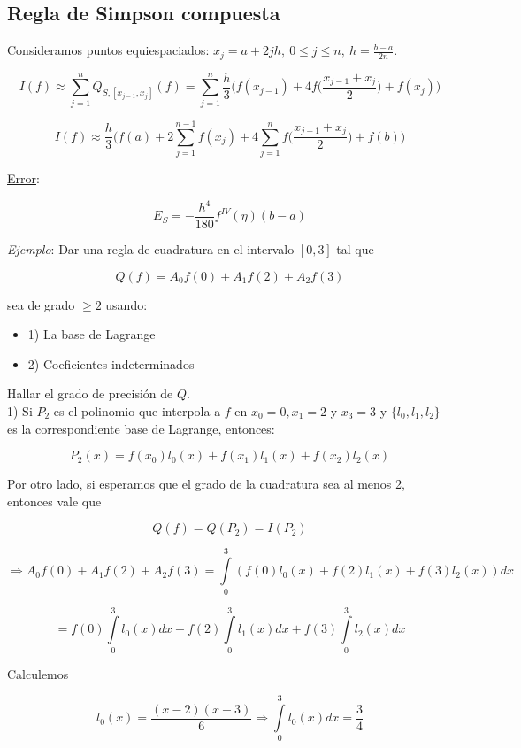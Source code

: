 \subsection{Regla de Simpson compuesta}

Consideramos puntos equiespaciados: $x_{j} = a + 2jh,\ 0 \leq j \leq n,\ h = \frac{b - a}{2n}$.

$$I(f) \approx \sum \limits_{j = 1}^{n} Q_{S, [x_{j - 1}, x_{j}]}(f) = \sum \limits_{j = 1}^{n} \frac{h}{3} \bigg(f(x_{j - 1}) + 4f\bigg( \frac{x_{j - 1} + x_{j}}{2}\bigg) + f(x_{j}) \bigg)$$

$$I(f) \approx \frac{h}{3} \bigg(f(a) + 2\sum \limits_{j = 1}^{n - 1}    f(x_{j}) + 4\sum \limits_{j = 1}^{n}f\bigg( \frac{x_{j - 1} + x_{j}}{2}\bigg) + f(b) \bigg)$$

\underline{Error}:

$$E_{S} = - \frac{h^{4}}{180} f^{IV}(\eta)(b - a)$$

\textit{Ejemplo}: Dar una regla de cuadratura en el intervalo $[0, 3]$ tal que 

$$Q(f) = A_{0}f(0) + A_{1}f(2) + A_{2}f(3)$$

sea de grado $\geq 2$ usando:

\begin{itemize}
	\item 1) La base de Lagrange
	\item 2) Coeficientes indeterminados
\end{itemize}

Hallar el grado de precisi\'on de $Q$.\\

1) Si $P_{2}$ es el polinomio que interpola a $f$ en $x_{0} = 0, x_{1} = 2$ y $x_{3} = 3$ y $\{l_{0}, l_{1}, l_{2}\}$ es la correspondiente base de Lagrange, entonces:

$$P_{2}(x) = f(x_{0})l_{0}(x) + f(x_{1})l_{1}(x) + f(x_{2})l_{2}(x)$$

Por otro lado, si esperamos que el grado de la cuadratura sea al menos 2, entonces vale que

$$Q(f) = Q(P_{2}) = I(P_{2})$$

$$\Rightarrow A_{0}f(0) + A_{1}f(2) + A_{2}f(3) = \int \limits_{0}^{3} (f(0)l_{0}(x) + f(2)l_{1}(x) + f(3)l_{2}(x))dx$$

$$ = f(0)\int \limits_{0}^{3} l_{0}(x) dx + f(2)\int \limits_{0}^{3}l_{1}(x) dx + f(3)\int \limits_{0}^{3} l_{2}(x) dx$$

Calculemos

$$l_{0}(x) = \frac{(x - 2)(x - 3)}{6} \Rightarrow \int \limits_{0}^{3} l_{0}(x) dx = \frac{3}{4}$$

